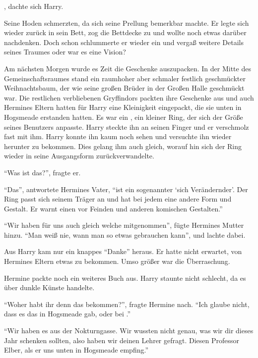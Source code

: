 , dachte sich Harry. 

Seine Hoden schmerzten, da sich seine Prellung bemerkbar machte. Er legte sich wieder zurück in sein Bett, zog die Bettdecke zu und wollte noch etwas darüber nachdenken. Doch schon schlummerte er wieder ein und vergaß weitere Details seines Traumes \gst oder war es eine Vision?

Am nächsten Morgen wurde es Zeit die Geschenke auszupacken. In der Mitte des Gemeinschaftsraumes stand ein raumhoher aber schmaler festlich geschmückter Weihnachtsbaum, der wie seine großen Brüder in der Großen Halle geschmückt war. Die restlichen verbliebenen Gryffindors packten ihre Geschenke aus und auch Hermines Eltern hatten für Harry eine Kleinigkeit eingepackt, die sie unten in Hogsmeade erstanden hatten. Es war ein , ein kleiner Ring, der sich der Größe seines Benutzers anpasste. Harry steckte ihn an seinen Finger und er verschmolz fast mit ihm. Harry konnte ihn kaum noch sehen und versuchte ihn wieder herunter zu bekommen. Dies gelang ihm auch gleich, worauf hin sich der Ring wieder in seine Ausgangsform zurückverwandelte.

\enquote{Was ist das?}, fragte er.

\enquote{Das}, antwortete Hermines Vater, \enquote{ist ein sogenannter \enquote{sich Verändernder}. Der Ring passt sich seinem Träger an und hat bei jedem eine andere Form und Gestalt. Er warnt einen vor Feinden und anderen komischen Gestalten.}

\enquote{Wir haben für uns auch gleich welche mitgenommen}, fügte Hermines Mutter hinzu. \enquote{Man weiß nie, wann man so etwas gebrauchen kann}, und lachte dabei.

Aus Harry kam nur ein knappes \enquote{Danke} heraus. Er hatte nicht erwartet, von Hermines Eltern etwas zu bekommen. Umso größer war die Überraschung.

Hermine packte noch ein weiteres Buch aus. Harry staunte nicht schlecht, da es über dunkle Künste handelte.

\enquote{Woher habt ihr denn das bekommen?}, fragte Hermine nach. \enquote{Ich glaube nicht, dass es das in Hogsmeade gab, oder bei \fab.}

\enquote{Wir haben es aus der Nokturngasse. Wir wussten nicht genau, was wir dir dieses Jahr schenken sollten, also haben wir deinen Lehrer gefragt. Diesen Professor Elber, als er uns unten in Hogsmeade empfing.}

